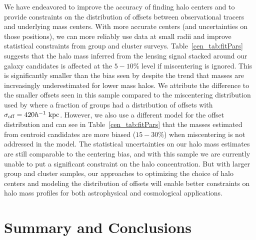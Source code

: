 We have endeavored to improve the accuracy of finding
halo centers and to provide constraints on the distribution of offsets
between observational tracers and underlying mass centers. With more
accurate centers (and uncertainties on those positions), we can more
reliably use data at small radii and improve statistical constraints
from group and cluster surveys. Table~\ref{cen_tab:fitPars} suggests
that the halo mass inferred from the lensing signal stacked around our
galaxy candidates is affected at the $5-10\%$ level if miscentering is
ignored. This is significantly smaller than the bias seen by
\citet{Mandelbaum2010} despite the trend that masses are increasingly
underestimated for lower mass halos. We attribute the difference to
the smaller offsets seen in this sample compared to the miscentering
distribution used by \citet{Johnston2007b} where a fraction of groups
had a distribution of offsets with $\sigma_{\rm off}=420 h^{-1}~{\rm
  kpc}$. However, we also use a different model for the offset
distribution and can see in Table~\ref{cen_tab:fitPars} that the masses
estimated from centroid candidates are more biased ($15-30\%$) when
miscentering is not addressed in the model. The statistical
uncertainties on our halo mass estimates are still comparable to the
centering bias, and with this sample we are currently unable to put a
significant constraint on the halo concentration. But with larger
group and cluster samples, our approaches to optimizing the choice of
halo centers and modeling the distribution of offsets will enable
better constraints on halo mass profiles for both astrophysical and
cosmological applications.


\section{Summary and Conclusions}
\label{cen_s:conclusion}

